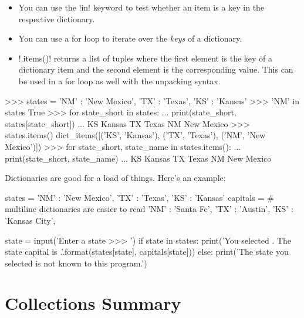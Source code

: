 \documentclass[11pt]{cselabheader}
\begin{document}
\begin{itemize}
  \item You can use the \pythoninline!in! keyword to test whether an item is a
    key in the respective dictionary.
  \item You can use a for loop to iterate over the \emph{keys} of a dictionary.
  \item \pythoninline!.items()! returns a list of tuples where the first element
    is the key of a dictionary item and the second element is the corresponding
    value. This can be used in a for loop as well with the unpacking syntax.
\end{itemize}

\begin{pyconcode}
>>> states = {'NM' : 'New Mexico', 'TX' : 'Texas', 'KS' : 'Kansas'}
>>> 'NM' in states
True
>>> for state_short in states:
...     print(state_short, states[state_short])
...
KS Kansas
TX Texas
NM New Mexico
>>> states.items()
dict_items([('KS', 'Kansas'), ('TX', 'Texas'), ('NM', 'New Mexico')])
>>> for state_short, state_name in states.items():
...     print(state_short, state_name)
...
KS Kansas
TX Texas
NM New Mexico
\end{pyconcode}

Dictionaries are good for a load of things. Here's an example:

\begin{python3code}
states = {'NM' : 'New Mexico', 'TX' : 'Texas', 'KS' : 'Kansas'}
capitals = { # multiline dictionaries are easier to read
  'NM' : 'Santa Fe',
  'TX' : 'Austin',
  'KS' : 'Kansas City',
}

state = input('Enter a state >>> ')
if state in states:
    print('You selected {}. The state capital is {}.'.format(states[state], 
        capitals[state]))
else:
    print('The state you selected is not known to this program.')
\end{python3code}

\pagebreak

\section{Collections Summary}
\end{document}
